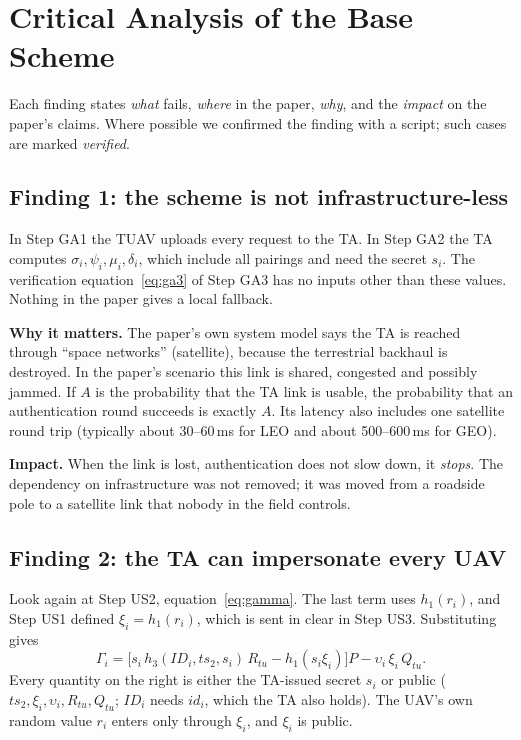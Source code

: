 \chapter{Critical Analysis of the Base Scheme}\label{sec:findings}
Each finding states \emph{what} fails, \emph{where} in the paper, \emph{why}, and the \emph{impact} on the paper's claims.
Where possible we confirmed the finding with a script; such cases are marked \emph{verified}.

\section{Finding 1: the scheme is not infrastructure-less}
\begin{flawbox}[title={Authentication requires a live satellite link to the TA}]
\begin{finding}\label{f:online}
In Step GA1 the TUAV uploads every request to the TA. In Step GA2 the TA computes $\sigma_i,\psi_i,\mu_i,\delta_i$, which include all
pairings and need the secret $s_i$. The verification equation~\eqref{eq:ga3} of Step GA3 has no inputs other than these values. Nothing in the paper
gives a local fallback.
\end{finding}
\textbf{Why it matters.} The paper's own system model says the TA is reached through ``space networks'' (satellite), because the
terrestrial backhaul is destroyed. In the paper's scenario this link is shared, congested and possibly jammed. If $A$ is the probability that the
TA link is usable, the probability that an authentication round succeeds is exactly $A$. Its latency also includes one satellite round trip
(typically about 30--60\,ms for LEO and about 500--600\,ms for GEO).

\textbf{Impact.} When the link is lost, authentication does not slow down, it \emph{stops}. The dependency on infrastructure was not removed; it
was moved from a roadside pole to a satellite link that nobody in the field controls.
\end{flawbox}

\section{Finding 2: the TA can impersonate every UAV}
Look again at Step US2, equation~\eqref{eq:gamma}. The last term uses $h_1(r_i)$, and Step US1 defined $\xi_i=h_1(r_i)$, which is sent in clear
in Step US3. Substituting gives
\begin{equation}
  \Gamma_i=\big[s_i\,h_3(ID_i,ts_2,s_i)\,R_{tu}-h_1(s_i\xi_i)\big]P-\upsilon_i\,\xi_i\,Q_{tu}.\label{eq:gamma2}
\end{equation}
Every quantity on the right is either the TA-issued secret $s_i$ or public ($ts_2,\xi_i,\upsilon_i,R_{tu},Q_{tu}$; $ID_i$ needs $id_i$, which
the TA also holds). The UAV's own random value $r_i$ enters only through $\xi_i$, and $\xi_i$ is public.

